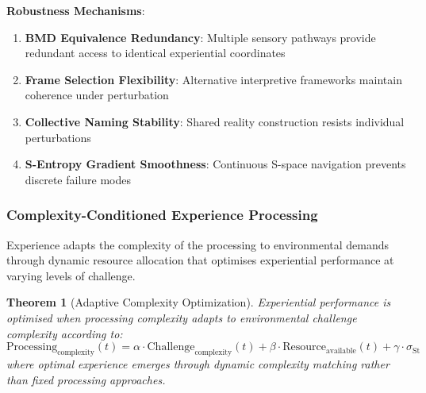 \documentclass{article}
\newtheorem{theorem}{Theorem}[section]
\begin{document}
\textbf{Robustness Mechanisms}:

\begin{enumerate}
\item \textbf{BMD Equivalence Redundancy}: Multiple sensory pathways provide redundant access to identical experiential coordinates
\item \textbf{Frame Selection Flexibility}: Alternative interpretive frameworks maintain coherence under perturbation
\item \textbf{Collective Naming Stability}: Shared reality construction resists individual perturbations
\item \textbf{S-Entropy Gradient Smoothness}: Continuous S-space navigation prevents discrete failure modes
\end{enumerate}

\subsubsection{Complexity-Conditioned Experience Processing}

Experience adapts the complexity of the processing to environmental demands through dynamic resource allocation that optimises experiential performance at varying levels of challenge.

\begin{theorem}[Adaptive Complexity Optimization]
\label{thm:adaptive_complexity}
Experiential performance is optimised when processing complexity adapts to environmental challenge complexity according to:
\begin{equation}
\text{Processing}_{\text{complexity}}(t) = \alpha \cdot \text{Challenge}_{\text{complexity}}(t) + \beta \cdot \text{Resource}_{\text{available}}(t) + \gamma \cdot \sigma_{\text{St}}
\end{equation}
where optimal experience emerges through dynamic complexity matching rather than fixed processing approaches.
\end{theorem}
\end{document}
